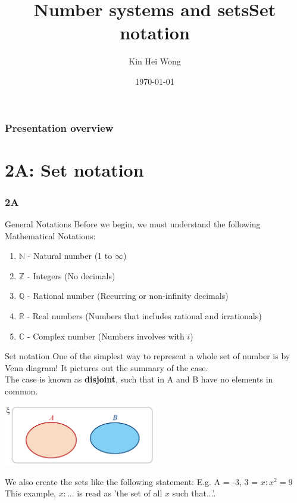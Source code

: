 \documentclass[
	11pt, %
]{beamer}
\title{Number systems and sets}
\author{Kin Hei Wong}
\date{\today}
\begin{document}
\begin{frame}
    \titlepage
\end{frame}

\begin{frame}
    \frametitle{Presentation overview}
    \tableofcontents
\end{frame}

\section{2A: Set notation}
\begin{frame}
    \frametitle{2A}
    \begin{center}
        \title{Set notation}
        \maketitle
    \end{center}
\end{frame}

\begin{frame}{General Notations}
    Before we begin, we must understand the following Mathematical Notations:
    \begin{enumerate}
        \item $\mathbb{N}$ - Natural number (1 to $\infty$)
        \item $\mathbb{Z}$ - Integers (No decimals)
        \item $\mathbb{Q}$ - Rational number (Recurring or non-infinity decimals)
        \item $\mathbb{R}$ - Real numbers (Numbers that includes rational and irrationals)
        \item $\mathbb{C}$ - Complex number (Numbers involves with $i$)
    \end{enumerate}
\end{frame}

\begin{frame}{Set notation}
    One of the simplest way to represent a whole set of number is by Venn diagram! It pictures out the summary of the case.\\
    The case is known as \textbf{disjoint}, such that in A and B have no elements in common.\\
    \begin{center}
        \includegraphics[width=0.5\textwidth]{disjoint.png}
    \end{center}
    We also create the sets like the following statement: E.g. A = {-3, 3} = {$x: x^2=9$}\\
    This example, {$x: ...$} is read as 'the set of all $x$ such that...'.
\end{frame}
\end{document}
